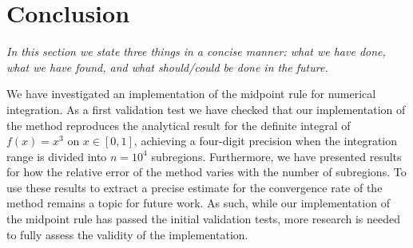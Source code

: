 \documentclass[english,notitlepage,reprint,nofootinbib]{revtex4-1}  %
\begin{document}
\section{Conclusion}\label{sec:conclusion}
\textit{In this section we state three things in a concise manner: what we have done, what we have found, and what should/could be done in the future.} 

We have investigated an implementation of the midpoint rule for numerical integration. As a first validation test we have checked that our implementation of the method reproduces the analytical result for the definite integral of $f(x) = x^3$ on $x \in [0,1]$, achieving a four-digit precision when the integration range is divided into $n=10^4$ subregions. Furthermore, we have presented results for how the relative error of the method varies with the number of subregions. To use these results to extract a precise estimate for the convergence rate of the method remains a topic for future work. As such, while our implementation of the midpoint rule has passed the initial validation tests, more research is needed to fully assess the validity of the implementation.

\onecolumngrid

%

    
    
\end{document}
